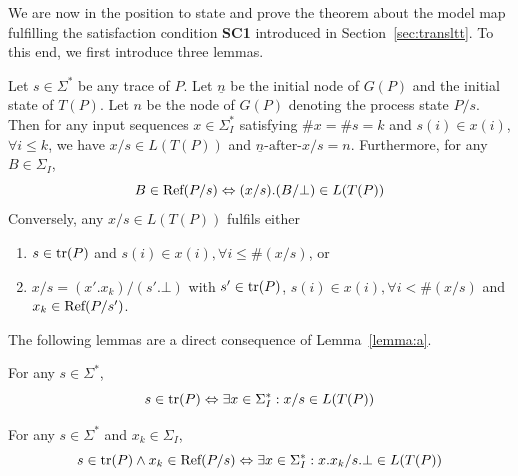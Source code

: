 We are now in the position to state and prove the theorem about the model map 
fulfilling the satisfaction condition {\bf SC1} introduced in Section~\ref{sec:transltt}. To this end, we first introduce three lemmas.



\begin{lemma}\label{lemma:a}
Let $s\in \Sigma^*$ be any trace of $P$. Let $\underline n$ be the initial node of $G(P)$ and the initial state of $T(P)$. Let $n$ be the node of $G(P)$ denoting the process state $P/s$. Then for any input sequences $x\in \Sigma_I^*$ satisfying 
$\#x = \#s = k$   and $s(i)\in x(i)$, $\forall i\le k$, we have $x/s\in L(T(P))$ and $\underline n{\text{-after-}}x/s=n$. Furthermore,
for any $B\in \Sigma_I$, 
$$
B\in {\text{\rm Ref}}(P/s)\Leftrightarrow (x/s).(B/\bot) \in L(T(P))
$$
Conversely, any $x/s\in L(T(P))$ fulfils either
\begin{enumerate}
\item  $s\in {\text {\rm tr}}(P)$ and $s(i)\in x(i), \forall i\le \#(x/s)$,
or
\item $x/s=(x'.x_k)/(s'.\bot)$ with $s'\in {\text {\rm tr}}(P)$, $s(i)\in x(i), \forall i< \#(x/s)$ and $x_k\in {\text{\rm Ref}}(P/s')$. 
\end{enumerate}
\end{lemma}


The following lemmas are a direct consequence of Lemma~\ref{lemma:a}.


\begin{lemma}
For any $s\in \Sigma^*$, 
$$s\in {\text {\rm tr}}(P) \Leftrightarrow \exists x\in \Sigma_I^*: x/s \in L(T(P))$$
\end{lemma}

\begin{lemma}
For any $s\in \Sigma^*$ and $x_k\in \Sigma_I$, 
$$s\in {\text {\rm tr}}(P) \wedge  x_k\in {\text {\rm Ref}}(P/s)\Leftrightarrow \exists x\in \Sigma_I^*: x.x_k/s.\bot \in L(T(P))$$
\end{lemma}

